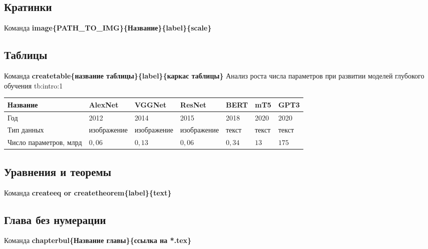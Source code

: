 \subsection{Кратинки}
Команда \textbf{image\{PATH\_TO\_IMG\}\{Название\}\{label\}\{scale\}}

\subsection{Таблицы}
Команда \textbf{createtable\{название таблицы\}\{label\}\{каркас таблицы\}} 
\createtable
{Анализ роста числа параметров при развитии моделей глубокого обучения}
{tb:intro:1}
{
    \begin{tabular}{|l|l|l|l|l|l|l|}
    \hline
    Название               & AlexNet     & VGGNet      & ResNet      & BERT     & mT5   & GPT3  \\ \hline
    Год                          & 2012        & 2014        & 2015        & 2018     & 2020  & 2020  \\ \hline
    Тип данных             & изображение & изображение & изображение & текст    & текст & текст \\ \hline
    Число параметров, млрд & $0{,}06$    & $0{,}13$    & $0{,}06$    & $0{,}34$ & $13$  & $175$ \\ \hline
    \end{tabular}
}

\subsection{Уравнения и теоремы}
Команда \textbf{createeq or createtheorem\{label\}\{text\}}

\subsection{Глава без нумерации}
Команда \textbf{chapterbul\{Название главы\}\{ссылка на *.tex\}}